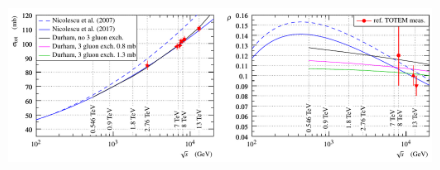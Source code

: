 \begin{figure}
\vskip-5mm
\begin{center}
\includegraphics{fig/matching_models_si_tot_rho.pdf}
\caption{%
}
\label{fig:match models}
\end{center}
\end{figure}
